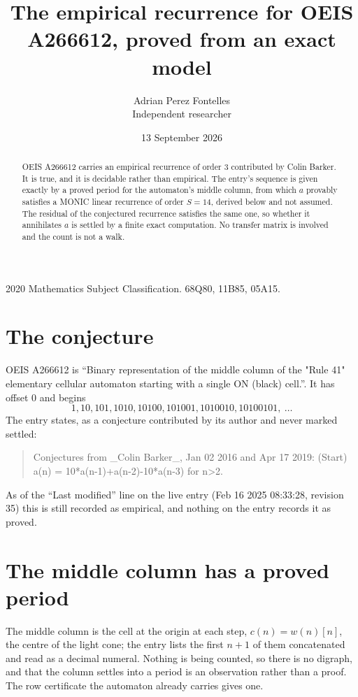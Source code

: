 \documentclass[11pt,a4paper]{article}
\title{The empirical recurrence for OEIS A266612, proved from an exact model}
\author{Adrian Perez Fontelles\\ \small Independent researcher}
\date{13 September 2026}
\theoremstyle{plain}
\theoremstyle{definition}
\begin{document}
\maketitle

\begin{abstract}
OEIS A266612 carries an empirical recurrence of order $3$ contributed by Colin Barker. It is true, and it is
decidable rather than empirical. The entry's sequence is given exactly by a proved period for the automaton's middle column, from
which $a$ provably satisfies a MONIC linear recurrence of order $S=14$, derived below and not
assumed. The residual of the conjectured recurrence satisfies the same one, so whether it
annihilates $a$ is settled by a finite exact computation. No transfer matrix is involved and
the count is not a walk.
\end{abstract}

\noindent\small 2020 Mathematics Subject Classification. 68Q80, 11B85, 05A15.\normalsize

\section{The conjecture}

OEIS A266612 is ``Binary representation of the middle column of the "Rule 41" elementary cellular automaton starting with a single ON (black) cell.''. It has offset $0$ and begins
\[
1, 10, 101, 1010, 10100, 101001, 1010010, 10100101,\ \dots
\]
The entry states, as a conjecture contributed by its author and never marked settled:
\begin{quote}
Conjectures from \_Colin Barker\_, Jan 02 2016 and Apr 17 2019: (Start) a(n) = 10*a(n-1)+a(n-2)-10*a(n-3) for n>2.
\end{quote}
As of the ``Last modified'' line on the live entry (Feb 16 2025 08:33:28, revision 35)
this is still recorded as empirical, and nothing on the entry records it as proved.

\section{The middle column has a proved period}

The middle column is the cell at the origin at each step, $c(n)=w(n)[n]$, the centre of the
light cone; the entry lists the first $n+1$ of them concatenated and read as a decimal numeral. Nothing is being counted, so there is no digraph, and that
the column settles into a period is an observation rather than a proof. The row certificate the
automaton already carries gives one.
\end{document}
